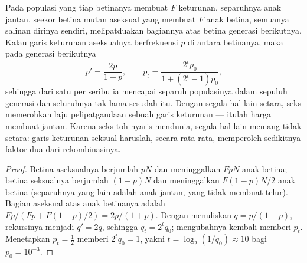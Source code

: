 \begin{theorem}\label{thm:b2:asexual-reproduction:twofold}
Pada populasi yang tiap betinanya membuat $F$ keturunan, separuhnya
anak jantan, seekor betina mutan aseksual yang membuat $F$ anak betina,
semuanya salinan dirinya sendiri, melipatduakan bagiannya atas betina
generasi berikutnya. Kalau garis keturunan aseksualnya berfrekuensi $p$
di antara betinanya, maka pada generasi berikutnya
\[
p' = \frac{2p}{1 + p}, \qquad p_t = \frac{2^t p_0}{1 + (2^t - 1)p_0},
\]
sehingga dari satu per seribu ia mencapai separuh populasinya dalam
sepuluh generasi dan seluruhnya tak lama sesudah itu. Dengan segala
hal lain setara, seks memerohkan laju pelipatgandaan sebuah garis
keturunan --- itulah harga membuat jantan. Karena seks toh nyaris
mendunia, segala hal lain memang tidak setara: garis keturunan seksual
haruslah, secara rata-rata, memperoleh sedikitnya faktor dua dari
rekombinasinya.
\end{theorem}
\begin{proof}
Betina aseksualnya berjumlah $pN$ dan meninggalkan $FpN$ anak betina;
betina seksualnya berjumlah $(1 - p)N$ dan meninggalkan $F(1 - p)N/2$
anak betina (separuhnya yang lain adalah anak jantan, yang tidak
membuat telur). Bagian aseksual atas anak betinanya adalah
$Fp/(Fp + F(1 - p)/2) = 2p/(1 + p)$. Dengan menuliskan $q = p/(1 -
p)$, rekursinya menjadi $q' = 2q$, sehingga $q_t = 2^t q_0$; mengubahnya
kembali memberi $p_t$. Menetapkan $p_t = \tfrac12$ memberi $2^t q_0 = 1$, yakni
$t = \log_2(1/q_0) \approx 10$ bagi $p_0 = 10^{-3}$.
\end{proof}

